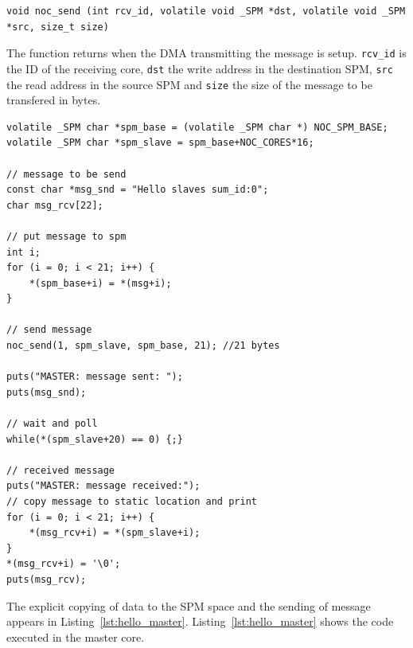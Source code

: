 \documentclass[a4paper,fontsize=10pt,twoside,DIV15,BCOR12mm,headinclude=true,footinclude=false,pagesize,bibtotoc]{scrbook}
\newcommand{\code}[1]{{\texttt{#1}}}
\begin{document}
\begin{lstlisting}
void noc_send (int rcv_id, volatile void _SPM *dst, volatile void _SPM *src, size_t size)
\end{lstlisting}

The function returns when the DMA transmitting the message is setup. \code{rcv\_id}
is the ID of the receiving core, \code{dst} the write address
in the destination SPM, \code{src} the read address
in the source SPM and \code{size} the size of the message to be transfered in bytes.

\begin{lstlisting}[float,caption={A 2x2 Hello World application: Master.\label{lst:hello_master}}]
volatile _SPM char *spm_base = (volatile _SPM char *) NOC_SPM_BASE;
volatile _SPM char *spm_slave = spm_base+NOC_CORES*16;

// message to be send
const char *msg_snd = "Hello slaves sum_id:0";
char msg_rcv[22];

// put message to spm
int i;
for (i = 0; i < 21; i++) {
	*(spm_base+i) = *(msg+i);
}

// send message
noc_send(1, spm_slave, spm_base, 21); //21 bytes

puts("MASTER: message sent: ");
puts(msg_snd);

// wait and poll
while(*(spm_slave+20) == 0) {;}

// received message
puts("MASTER: message received:");
// copy message to static location and print
for (i = 0; i < 21; i++) {
	*(msg_rcv+i) = *(spm_slave+i);
}
*(msg_rcv+i) = '\0';
puts(msg_rcv);

\end{lstlisting}


The explicit copying of data to the SPM space and the sending of message appears 
in Listing~\ref{lst:hello_master}. Listing~\ref{lst:hello_master}
shows the code executed in the master core.
\end{document}
